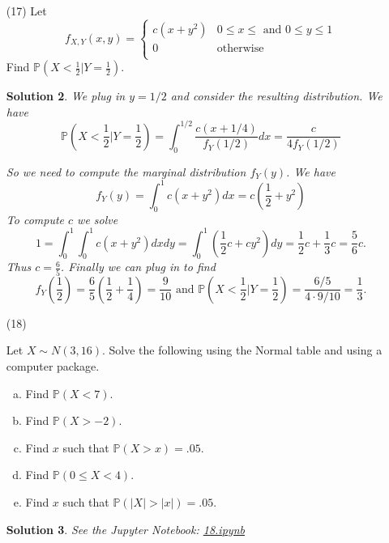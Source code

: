 \documentclass[10pt]{article}
\newtheorem*{sol}{Solution}
\renewcommand{\P}{\mathbb{P}}
\newcommand{\Binom}{\operatorname{Binomial}}
\newcommand{\Poiss}{\operatorname{Poisson}}
\begin{document}
\begin{enumerate}
\begin{sol}
We consider conditional probability distributions:
\[
f_{X|X+Y}(x|n) = \frac{f_{X,X+Y}(x,n)}{f_{X+Y}(n)}.
\]
We have $f_{X,X+Y}(x,y) = \P(X=x, X+Y=n) = \P(X=x) \P(Y = n-x)=f_X(x)f_Y(n-x)$.
Plugging in for $f_X$, $f_Y$, and $f_{X+Y}$ and noting that
$X+Y\sim \Poiss(\lambda+\mu)$ yields that $f_{X|X+Y}(x|n)$ is equal to
\[
\frac{e^{-\lambda}\frac{\lambda^x}{x!}e^{-\mu}\frac{\mu^{n-x}}{(n-x)!}}
{e^{-\lambda-\mu}\frac{(\lambda+\mu)^n}{n!}}
=
\binom{n}{x} \left(\frac{\lambda}{\lambda+\mu}\right)^x\left(\frac{\mu}{\lambda+\mu}\right)^{n-x}
= \binom{n}{x} (\lambda/\pi)^x (1-\lambda/\pi)^{n-x}.
\]
This is exactly the expression for the PDF of $\Binom(n,\pi)$ at $x$.
\end{sol}

\item[(17)]
Let
\[
f_{X,Y}(x,y) =
\begin{cases}
c(x+y^2) & 0\leq x \leq \text{ and } 0\leq y\leq 1 \\
0 & \text{otherwise} \\
\end{cases}
\]
Find $\P(X < \frac{1}{2} | Y=\frac{1}{2})$.

\begin{sol}
We plug in $y=1/2$ and consider the resulting distribution. We have
\[
\P\left(X<\frac{1}{2} | Y = \frac{1}{2}\right)
= \int_0^{1/2} \frac{c(x+1/4)}{f_Y(1/2)}dx
= \frac{c}{4f_Y(1/2)}
\]

So we need to compute the marginal distribution $f_Y(y)$. We have
\[
f_Y(y) = \int_0^1 c(x+y^2)dx = c\left(\frac{1}{2}+y^2\right)
\]
To compute $c$ we solve
\[
1 = \int_0^1 \int_0^1 c(x+y^2)dxdy = \int_0^1 \left(\frac{1}{2}c + cy^2\right)dy
= \frac{1}{2}c + \frac{1}{3}c = \frac{5}{6}c.
\]
Thus $c = \frac{6}{5}$. Finally we can plug in to find
\[
f_Y\left(\frac{1}{2}\right) = \frac{6}{5}\left(\frac{1}{2}+\frac{1}{4}\right)
= \frac{9}{10} \text{ and }
\P\left(X<\frac{1}{2} | Y = \frac{1}{2}\right) = \frac{6/5}{4 \cdot 9/10} =
\frac{1}{3}.
\]
\end{sol}

\item[(18)]

Let $X \sim N(3, 16)$. Solve the following using the Normal table and using
a computer package.
\begin{enumerate}[(a)]
\item Find $\P(X<7)$.
\item Find $\P(X>-2)$.
\item Find $x$ such that $\P(X > x) = .05$.
\item Find $\P(0 \leq X < 4)$.
\item Find $x$ such that $\P(|X| > |x|) = .05$.
\end{enumerate}

\begin{sol}
See the Jupyter Notebook:
\href{https://github.com/ajrasmus/some_of_statistics/blob/main/chapter_2/18.ipynb}{18.ipynb}
\end{sol}
\end{enumerate}
\end{document}
